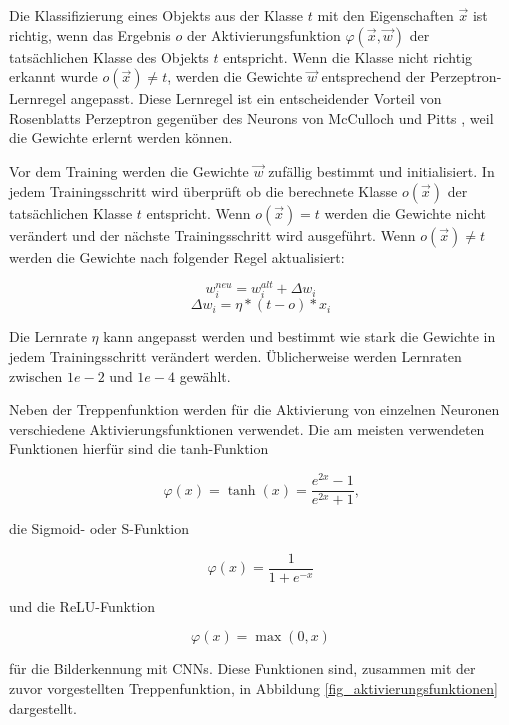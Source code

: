 Die Klassifizierung eines Objekts aus der Klasse $t$ mit den Eigenschaften $\vec{x}$ ist richtig, wenn das Ergebnis $o$ der Aktivierungsfunktion $\varphi(\vec{x},\vec{w})$ der tatsächlichen Klasse des Objekts $t$ entspricht. Wenn die Klasse nicht richtig erkannt wurde $o(\vec{x}) \neq t$, werden die Gewichte $\vec{w}$ entsprechend der Perzeptron-Lernregel angepasst. Diese Lernregel ist ein entscheidender Vorteil von Rosenblatts Perzeptron \cite{rosenblatt1958perceptron} gegenüber des Neurons von McCulloch und Pitts \cite{mcculloch1943logical}, weil die Gewichte erlernt werden können.

Vor dem Training werden die Gewichte $\vec{w}$ zufällig bestimmt und initialisiert. In jedem Trainingsschritt wird überprüft ob die berechnete Klasse $o(\vec{x})$ der tatsächlichen Klasse $t$ entspricht. Wenn $o(\vec{x}) = t$ werden die Gewichte nicht verändert und der nächste Trainingsschritt wird ausgeführt. Wenn $o(\vec{x}) \neq t$ werden die Gewichte nach folgender Regel aktualisiert:

\begin{equation}
w^{neu}_i = w^{alt}_i + \Delta w_i
\end{equation}
\begin{equation}
\Delta w_i = \eta*(t-o)*x_i
\end{equation}

Die Lernrate $\eta$ kann angepasst werden und bestimmt wie stark die Gewichte in jedem Trainingsschritt verändert werden. Üblicherweise werden Lernraten zwischen $1e-2$ und $1e-4$ gewählt.

Neben der Treppenfunktion werden für die Aktivierung von einzelnen Neuronen verschiedene Aktivierungsfunktionen verwendet. Die am meisten verwendeten Funktionen hierfür sind die \ac{tanh}-Funktion

\begin{equation}
\varphi(x) = \tanh(x) = \frac{e^{2x}-1}{e^{2x}+1} \text{,}
\end{equation}

\noindent die Sigmoid- oder S-Funktion

\begin{equation}
\varphi(x) = \frac{1}{1+e^{-x}}
\end{equation}

\noindent und die \ac{ReLU}-Funktion 

\begin{equation}
\varphi(x) = \max{(0, x)}
\end{equation}

\noindent für die Bilderkennung mit \acp{CNN}. Diese Funktionen sind, zusammen mit der zuvor vorgestellten Treppenfunktion, in Abbildung \ref{fig_aktivierungsfunktionen} dargestellt.

